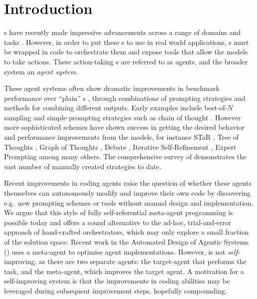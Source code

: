 \section{Introduction} \label{sec:introduction}

s have recently made impressive
advancements across a range of domains and tasks
\citep{anthropicIntroducingClaude35,googleIntroducingGemini2024,openaiOpenAIO1System}.
However, in order to put these s to use in real world applications,
s must be wrapped in
code to orchestrate them and expose tools that allow the models to take
actions. These action-taking s are referred to as agents, and the
broader system an \emph{agent system}.

These agent systems often show dramatic improvements in benchmark performance
over ``plain'' s \citep{yaoReActSynergizingReasoning2023,
zelikmanParselAlgorithmicReasoning2023, chenProgramThoughtsPrompting2023},
through combinations of prompting strategies and methods for combining
different  outputs. Early examples include best-of-$N$ sampling and
simple prompting strategies such as chain of thought
\citep{kojimaLargeLanguageModels2022}. However more sophisticated schemes have
shown success in getting the desired behavior and
performance improvements from the models, for instance STaR
\citep{zelikmanSTaRBootstrappingReasoning2022}, Tree of Thoughts
\citep{yaoTreeThoughtsDeliberate2023}, Graph of Thoughts
\citep{bestaGraphThoughtsSolving2023},  Debate
\citep{duImprovingFactualityReasoning2023}, Iterative Self-Refinement
\citep{madaanSelfRefineIterativeRefinement2023}, Expert Prompting
\citep{longMultiexpertPromptingImproves2024} among many others.
The comprehensive survey of \citet{schulhoffPromptReportSystematic2024}
demonstrates the vast number of manually created strategies to date.

Recent improvements in coding agents raise the question of whether these agents themselves can autonomously modify
and improve their own code by discovering e.g.\ new prompting schemes or tools without manual design and implementation.
We argue that this style of fully self-referential meta-agent programming is
possible today and offers a sound alternative to the ad-hoc, trial-and-error
approach of hand-crafted orchestrators, which may only explore a small fraction
of the solution space.
Recent work in the Automated Design of Agentic Systems ()
\citep{huAutomatedDesignAgentic2024} uses a meta-agent to optimise agent
implementations.
However, \citet{huAutomatedDesignAgentic2024} is not \textit{self}-improving, as
there are two separate agents: the target-agent that performs the task, and the
meta-agent, which improves the target agent. A motivation for a self-improving
system is that the improvements in coding abilities may be leveraged during
subsequent improvement steps, hopefully compounding.

